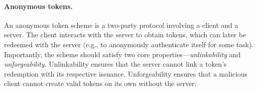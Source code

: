 %
%
%
%

\paragraph{Anonymous tokens.}
An anonymous token scheme is a two-party protocol involving a client and a
server. The client interacts with the server to obtain tokens, which can later
be redeemed with the server (e.g., to anonymously authenticate itself for some
task). Importantly, the scheme should satisfy two core
properties---\emph{unlinkability} and \emph{unforgeability}. Unlinkability
ensures that the server cannot link a token's redemption with its respective
issuance. Unforgeability ensures that a malicious client cannot create valid
tokens on its own without the server.

